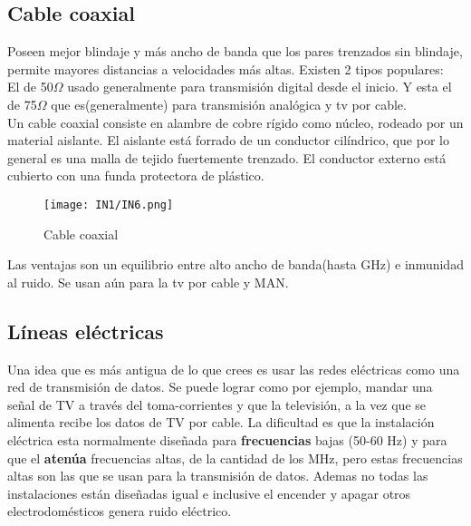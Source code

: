 \documentclass[
	12pt, %
	fleqn, %
	a4paper, %
]{LegrandOrangeBook}
\begin{document}
\subsection{Cable coaxial}
Poseen mejor blindaje y más ancho de banda que los pares trenzados sin blindaje, permite mayores distancias a velocidades más altas. Existen 2 tipos populares:\\
El de 50$\Omega$ usado generalmente para transmisión digital desde el inicio. Y esta el de 75$\Omega$ que es(generalmente) para transmisión analógica y tv por cable.\\
Un cable coaxial consiste en alambre de cobre rígido como núcleo, rodeado por un material aislante. El aislante está forrado de un conductor cilíndrico, que por lo general es una malla de tejido fuertemente trenzado. El conductor externo está cubierto con una funda protectora de plástico.
\begin{figure}[H]
\centering
\texttt{[image: IN1/IN6.png]}
\caption{Cable coaxial}
\label{fig:utp cat 5}
\end{figure}
Las ventajas son un equilibrio entre alto ancho de banda(hasta GHz) e inmunidad al ruido. Se usan aún para la tv por cable y MAN.
\subsection{Líneas eléctricas}
Una idea que es más antigua de lo que crees es usar las redes eléctricas como una red de transmisión de datos. Se puede lograr como por ejemplo, mandar una señal de TV a través del toma-corrientes y que la televisión, a la vez que se alimenta recibe los datos de TV por cable. La dificultad es que la instalación eléctrica esta normalmente diseñada para \textbf{frecuencias} bajas (50-60 Hz) y para que el \textbf{atenúa} frecuencias altas, de la cantidad de los MHz, pero estas frecuencias altas son las que se usan para la transmisión de datos. Ademas no todas las instalaciones están diseñadas igual e inclusive el encender y apagar otros electrodomésticos genera ruido eléctrico.
\end{document}
